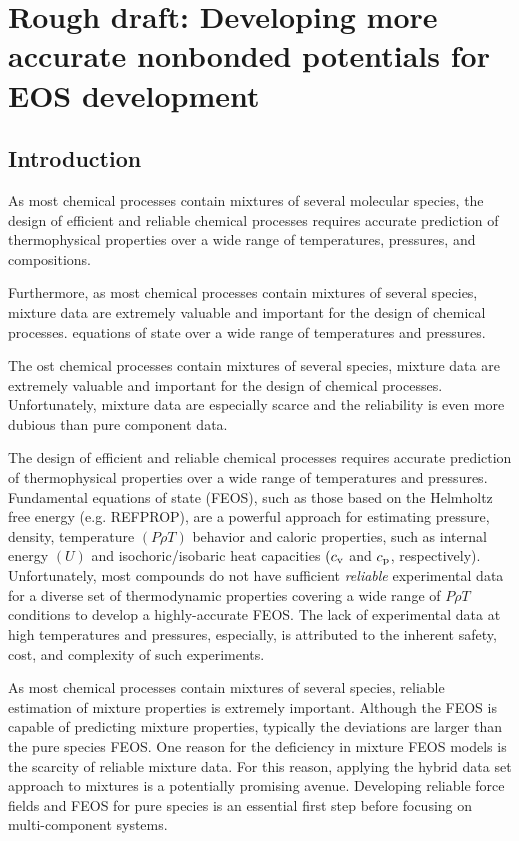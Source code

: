 \documentclass[11pt,a4paper]{article}
\begin{document}
\section{Rough draft: Developing more accurate nonbonded potentials for EOS development}

\subsection{Introduction}

As most chemical processes contain mixtures of several molecular species, the design of efficient and reliable chemical processes requires accurate prediction of thermophysical properties over a wide range of temperatures, pressures, and compositions. 

 Furthermore, as most chemical processes contain mixtures of several species, mixture data are extremely valuable and important for the design of chemical processes.  equations of state over a wide range of temperatures and pressures.

The ost chemical processes contain mixtures of several species, mixture data are extremely valuable and important for the design of chemical processes. Unfortunately, mixture data are especially scarce and the reliability is even more dubious than pure component data.


The design of efficient and reliable chemical processes requires accurate prediction of thermophysical properties over a wide range of temperatures and pressures. Fundamental equations of state (FEOS), such as those based on the Helmholtz free energy (e.g. REFPROP), are a powerful approach for estimating pressure, density, temperature $(P\rho T)$ behavior and caloric properties, such as internal energy $(U)$ and isochoric/isobaric heat capacities $(c_{\rm v}$ and $c_{\rm p}$, respectively). Unfortunately, most compounds do not have sufficient \textit{reliable} experimental data for a diverse set of thermodynamic properties covering a wide range of $P \rho T$ conditions to develop a highly-accurate FEOS. The lack of experimental data at high temperatures and pressures, especially, is attributed to the inherent safety, cost, and complexity of such experiments. 

As most chemical processes contain mixtures of several species, reliable estimation of mixture properties is extremely important. Although the FEOS is capable of predicting mixture properties, typically the deviations are larger than the pure species FEOS. One reason for the deficiency in mixture FEOS models is the scarcity of reliable mixture data. For this reason, applying the hybrid data set approach to mixtures is a potentially promising avenue. Developing reliable force fields and FEOS for pure species is an essential first step before focusing on multi-component systems.
\end{document}
